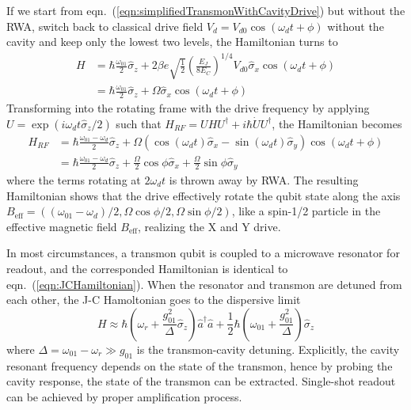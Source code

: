             If we start from eqn.~(\ref{eqn:simplifiedTransmonWithCavityDrive}) but without the RWA, switch back to classical drive field $V_d = V_{d0}\cos(\omega_d t + \phi) $ without the cavity and keep only the lowest two levels, the Hamiltonian turns to
            \begin{align}
                H &= \hbar \frac{\omega_{01}}{2} \hat \sigma_z + 2 \beta e \sqrt{ \frac{1}{2}} \left ( \frac{E_J}{8E_C} \right )^{1/4} V_{d0} \hat \sigma_x \cos(\omega_d t + \phi) \\
                &=   \hbar \frac{\omega_{01}}{2} \hat \sigma_z + \Omega \hat \sigma_x \cos(\omega_d t + \phi)
            \end{align}
            Transforming into the rotating frame with the drive frequency by applying $ U = \exp(i \omega_d t \hat \sigma_z /2) $ such that $ H_{RF} = UHU^\dagger + i\hbar \dot U U^\dagger $, the Hamiltonian becomes
            \begin{align}
                H_{RF} &= \hbar \frac{\omega_{01} - \omega_d}{2} \hat \sigma_z + \Omega ( \cos (\omega_d t) \hat \sigma_x - \sin (\omega_d t) \hat \sigma_y )\cos(\omega_d t + \phi)\\
                & = \hbar \frac{\omega_{01} - \omega_d}{2} \hat \sigma_z + \frac{\Omega}{2} \cos \phi \hat \sigma_x+ \frac{\Omega}{2} \sin \phi \hat \sigma_y
            \end{align}
            where the terms rotating at $ 2 \omega_d t $ is thrown away by RWA. The resulting Hamiltonian shows that the drive effectively rotate the qubit state along the axis $B_{\text{eff}} = ((\omega_{01} - \omega_d)/2,\Omega \cos \phi /2,\Omega \sin \phi /2)$, like a spin-1/2 particle in the effective magnetic field $B_{\text{eff}}$, realizing the X and Y drive.

            In most circumstances, a transmon qubit is coupled to a microwave resonator for readout, and the corresponded Hamiltonian is identical to eqn.~(\ref{eqn:JCHamiltonian}). When the resonator and transmon are detuned from each other, the J-C Hamoltonian goes to the dispersive limit\cite{Blais2004,schuster2007circuit}
            \begin{equation}
                H \approx \hbar \left (\omega_r + \frac{g_{01}^2}{\Delta} \hat \sigma_z \right )\hat a^\dagger \hat a+ \frac{1}{2} \hbar \left(\omega_{01} + \frac{g_{01}^2}{\Delta}\right) \hat \sigma_z
            \end{equation}
            where $ \Delta = \omega_{01} - \omega_r \gg g_{01}$ is the transmon-cavity detuning. Explicitly, the cavity resonant frequency depends on the state of the transmon, hence by probing the cavity response, the state of the transmon can be extracted. Single-shot readout can be achieved by proper amplification process\cite{Mallet2009,Sliwa2016}.



